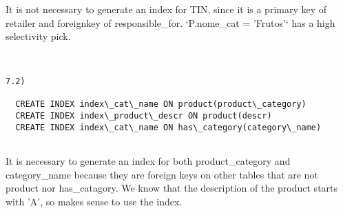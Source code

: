 \documentclass[12pt,a4paper]{report}
\begin{document}
It is not necessary to generate an index for TIN, since it is a primary key of retailer and foreignkey of responsible\_for.
`P.nome\_cat = 'Frutos'` has a high selectivity pick.


\begin{verbatim}


7.2)

  CREATE INDEX index\_cat\_name ON product(product\_category)
  CREATE INDEX index\_product\_descr ON product(descr)
  CREATE INDEX index\_cat\_name ON has\_category(category\_name)


\end{verbatim}

It is necessary to generate an index for both product\_category and category\_name because they are foreign keys on other tables that are not product nor has\_catagory.
We know that the description of the product starts with 'A', so makes sense to use the index.
\end{document}
